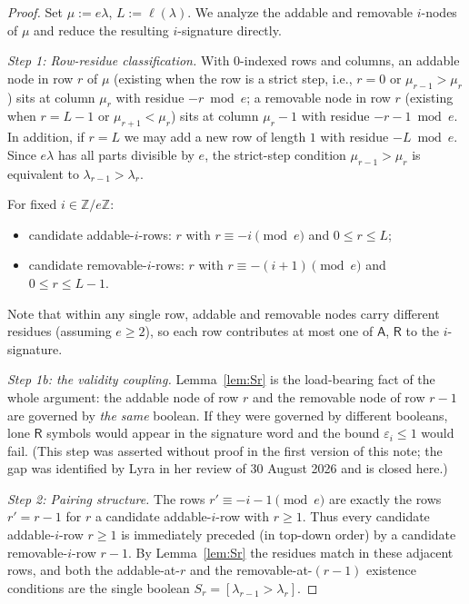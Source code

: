 \documentclass[11pt]{article}
\theoremstyle{definition}
\newcommand{\ZZ}{\mathbb{Z}}
\newcommand{\eps}{\varepsilon}
\newcommand{\Aa}{{\mathsf A}}
\newcommand{\Rr}{{\mathsf R}}
\begin{document}
\begin{proof}
Set $\mu := e\lambda$, $L := \ell(\lambda)$. We analyze the addable and
removable $i$-nodes of $\mu$ and reduce the resulting $i$-signature
directly.

\medskip
\emph{Step 1: Row-residue classification.} With $0$-indexed rows and
columns, an addable node in row $r$ of $\mu$ (existing when the row is a
strict step, i.e., $r = 0$ or $\mu_{r-1} > \mu_r$) sits at column $\mu_r$
with residue $-r \bmod e$; a removable node in row $r$ (existing when
$r = L - 1$ or $\mu_{r+1} < \mu_r$) sits at column $\mu_r - 1$ with residue
$-r - 1 \bmod e$. In addition, if $r = L$ we may add a new row of length
$1$ with residue $-L \bmod e$. Since $e\lambda$ has all parts divisible by
$e$, the strict-step condition $\mu_{r-1} > \mu_r$ is equivalent to
$\lambda_{r-1} > \lambda_r$.

For fixed $i \in \ZZ/e\ZZ$:
\begin{itemize}
  \item candidate addable-$i$-rows: $r$ with $r \equiv -i \pmod e$ and $0 \le r \le L$;
  \item candidate removable-$i$-rows: $r$ with $r \equiv -(i+1) \pmod e$ and $0 \le r \le L - 1$.
\end{itemize}
Note that within any single row, addable and removable nodes carry
different residues (assuming $e \ge 2$), so each row contributes at most
one of $\Aa$, $\Rr$ to the $i$-signature.

\medskip
\emph{Step 1b: the validity coupling.} Lemma~\ref{lem:Sr} is the
load-bearing fact of the whole argument: the addable node of row $r$ and the
removable node of row $r-1$ are governed by \emph{the same} boolean. If they
were governed by different booleans, lone $\Rr$ symbols would appear in the
signature word and the bound $\eps_i \le 1$ would fail. (This step was
asserted without proof in the first version of this note; the gap was
identified by Lyra in her review of 30 August 2026 and is closed here.)

\medskip
\emph{Step 2: Pairing structure.} The rows $r' \equiv -i - 1 \pmod e$ are
exactly the rows $r' = r - 1$ for $r$ a candidate addable-$i$-row with
$r \ge 1$. Thus every candidate addable-$i$-row $r \ge 1$ is immediately
preceded (in top-down order) by a candidate removable-$i$-row $r - 1$.
By Lemma~\ref{lem:Sr} the residues match in these adjacent rows, and both
the addable-at-$r$ and the removable-at-$(r-1)$ existence conditions are the
single boolean $S_r = [\lambda_{r-1} > \lambda_r]$.


\end{proof}
\end{document}

